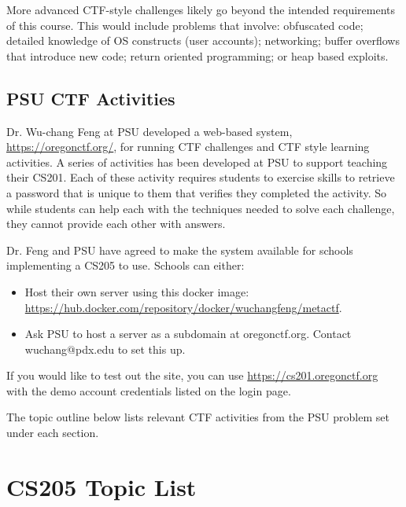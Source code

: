 \documentclass[12pt,letterpaper]{article}
\begin{document}
	More advanced CTF-style challenges likely go beyond the intended requirements of this course. This would include problems that involve: obfuscated code; detailed knowledge of OS constructs (user accounts); networking; buffer overflows that introduce new code; return oriented programming; or heap based exploits.

	\subsection*{PSU CTF Activities}

	Dr. Wu-chang Feng at PSU developed a web-based system, \url{https://oregonctf.org/}, for running CTF challenges and CTF style learning activities. A series of activities has been developed at PSU to support teaching their CS201. Each of these activity requires students to exercise skills to retrieve a password that is unique to them that verifies they completed the activity. So while students can help each with the techniques needed to solve each challenge, they cannot provide each other with answers.
	
	Dr. Feng and PSU have agreed to make the system available for schools implementing a CS205 to use. Schools can either:
	
	\begin{itemize}
		\item Host their own server using this docker image: \url{https://hub.docker.com/repository/docker/wuchangfeng/metactf}.
		\item Ask PSU to host a server as a subdomain at oregonctf.org. Contact wuchang@pdx.edu to set this up.
	\end{itemize}

	If you would like to test out the site, you can use \url{https://cs201.oregonctf.org} with the demo account credentials listed on the login page.

	The topic outline below lists relevant CTF activities from the PSU problem set under each section. 


	\section{CS205 Topic List}

		
\end{document}
